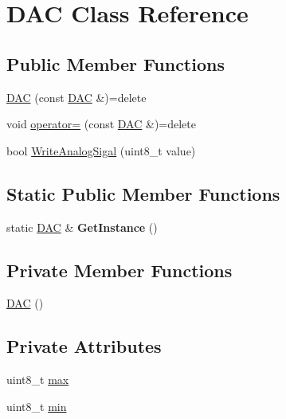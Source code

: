 \hypertarget{class_d_a_c}{\section{D\-A\-C Class Reference}
\label{class_d_a_c}
}
\subsection*{Public Member Functions}
\begin{DoxyCompactItemize}
\item 
\hyperlink{class_d_a_c_af656669246f70c7ccbbd05d0e65088d4}{D\-A\-C} (const \hyperlink{class_d_a_c}{D\-A\-C} \&)=delete
\item 
void \hyperlink{class_d_a_c_a9e16a3d53b57588cba0ff2f9ade78e6b}{operator=} (const \hyperlink{class_d_a_c}{D\-A\-C} \&)=delete
\item 
bool \hyperlink{class_d_a_c_ae7d843a3795822e893fb2b2d996b0666}{Write\-Analog\-Sigal} (uint8\-\_\-t value)
\end{DoxyCompactItemize}
\subsection*{Static Public Member Functions}
\begin{DoxyCompactItemize}
\item 
\hypertarget{class_d_a_c_aa97df751677eb0db87b3e3a5a1cb6049}{static \hyperlink{class_d_a_c}{D\-A\-C} \& {\bfseries Get\-Instance} ()}\label{class_d_a_c_aa97df751677eb0db87b3e3a5a1cb6049}

\end{DoxyCompactItemize}
\subsection*{Private Member Functions}
\begin{DoxyCompactItemize}
\item 
\hyperlink{class_d_a_c_a9908e07a5c096380eeb4c4061d58476d}{D\-A\-C} ()
\end{DoxyCompactItemize}
\subsection*{Private Attributes}
\begin{DoxyCompactItemize}
\item 
uint8\-\_\-t \hyperlink{class_d_a_c_a229a81d8ebf43511dfb6815c5cd8f425}{max}
\item 
uint8\-\_\-t \hyperlink{class_d_a_c_aa4f21cf166374cfc6edcd412f4d2072b}{min}
\end{DoxyCompactItemize}


